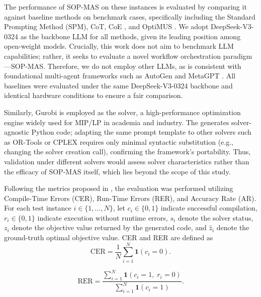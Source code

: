 \documentclass[preprint,12pt]{elsarticle}
\begin{document}
The performance of SOP-MAS on these instances is evaluated by comparing it against baseline methods on benchmark cases, specifically including the Standard Prompting Method (SPM), CoT, CoE \citep{xiaoChainofExpertsWhenLLMs2023}, and OptiMUS \citep{ahmaditeshniziOptiMUSScalableOptimization2024b}. We adopt DeepSeek-V3-0324 as the backbone LLM for all methods, given its leading position among open-weight models. Crucially, this work does not aim to benchmark LLM capabilities; rather, it seeks to evaluate a novel workflow orchestration paradigm—SOP-MAS. Therefore, we do not employ other LLMs, as is consistent with foundational multi-agent frameworks such as AutoGen \citep{wuAutoGenEnablingNextGen2024} and MetaGPT \citep{hongMetaGPTMetaProgramming2023a}. All baselines were evaluated under the same DeepSeek-V3-0324 backbone and identical hardware conditions to ensure a fair comparison.

Similarly, Gurobi is employed as the solver, a high-performance optimization engine widely used for MIP/LP in academia and industry. The  generates solver-agnostic Python code; adapting the same prompt template to other solvers such as OR-Tools or CPLEX requires only minimal syntactic substitution (e.g., changing the solver creation call), confirming the framework's portability. Thus, validation under different solvers would assess solver characteristics rather than the efficacy of SOP-MAS itself, which lies beyond the scope of this study.

Following the metrics proposed in \citet{xiaoChainofExpertsWhenLLMs2023}, the evaluation was performed utilizing Compile-Time Errors (CER), Run-Time Errors (RER), and Accuracy Rate (AR). For each test instance $i \in \{1,\dots,N\}$, let $c_i \in \{0,1\}$ indicate successful compilation, $r_i \in \{0,1\}$ indicate execution without runtime errors, $s_i$ denote the solver status, $z_i$ denote the objective value returned by the generated code, and $\hat z_i$ denote the ground-truth optimal objective value. CER and RER are defined as
\begin{equation}
\mathrm{CER}=\frac{1}{N}\sum_{i=1}^{N}\mathbf{1}(c_i=0).
\end{equation}


\begin{equation}
 \mathrm{RER}=\frac{\sum_{i=1}^{N}\mathbf{1}(c_i=1,\; r_i=0)}{\sum_{i=1}^{N}\mathbf{1}(c_i=1)}. 
\end{equation}
\end{document}
